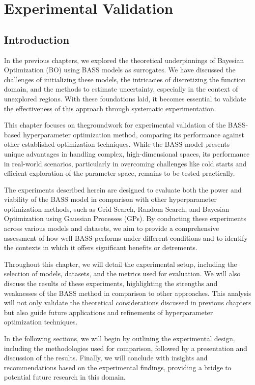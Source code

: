 \chapter{Experimental Validation}

\section{Introduction}

In the previous chapters, we explored the theoretical underpinnings of Bayesian Optimization (BO) using BASS models as surrogates. We have discussed the challenges of initializing these models, the intricacies of discretizing the function domain, and the methods to estimate uncertainty, especially in the context of unexplored regions. With these foundations laid, it becomes essential to validate the effectiveness of this approach through systematic experimentation.

This chapter focuses on thegroundwork for experimental validation of the BASS-based hyperparameter optimization method, comparing its performance against other established optimization techniques. While the BASS model presents unique advantages in handling complex, high-dimensional spaces, its performance in real-world scenarios, particularly in overcoming challenges like cold starts and efficient exploration of the parameter space, remains to be tested practically.

The experiments described herein are designed to evaluate both the power and viability of the BASS model in comparison with other hyperparameter optimization methods, such as Grid Search, Random Search, and Bayesian Optimization using Gaussian Processes (GPs). By conducting these experiments across various models and datasets, we aim to provide a comprehensive assessment of how well BASS performs under different conditions and to identify the contexts in which it offers significant benefits or detrements. 

Throughout this chapter, we will detail the experimental setup, including the selection of models, datasets, and the metrics used for evaluation. We will also discuss the results of these experiments, highlighting the strengths and weaknesses of the BASS method in comparison to other approaches. This analysis will not only validate the theoretical considerations discussed in previous chapters but also guide future applications and refinements of hyperparameter optimization techniques.

In the following sections, we will begin by outlining the experimental design, including the methodologies used for comparison, followed by a presentation and discussion of the results. Finally, we will conclude with insights and recommendations based on the experimental findings, providing a bridge to potential future research in this domain.

